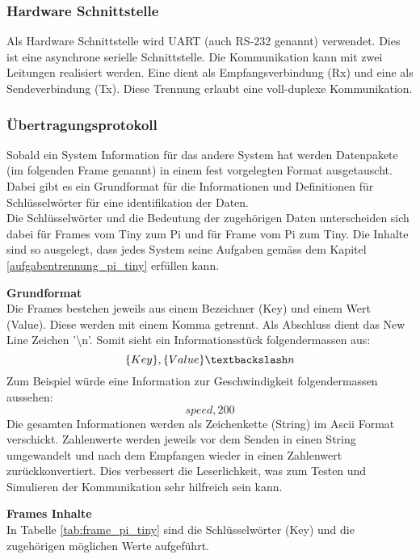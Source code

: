 \documentclass[../../main.tex]{subfiles}
\begin{document}
    \subsubsection{Hardware Schnittstelle}
    Als Hardware Schnittstelle wird UART (auch RS-232 genannt) verwendet. Dies ist eine asynchrone serielle Schnittstelle. Die Kommunikation kann mit zwei Leitungen realisiert werden. Eine dient als Empfangsverbindung (Rx) und eine als Sendeverbindung (Tx). Diese Trennung erlaubt eine voll-duplexe Kommunikation.

    \subsubsection{Übertragungsprotokoll}
    Sobald ein System Information für das andere System hat werden Datenpakete (im folgenden Frame genannt) in einem fest vorgelegten Format ausgetauscht. Dabei gibt es ein Grundformat für die Informationen und Definitionen für Schlüsselwörter für eine identifikation der Daten.\\
    Die Schlüsselwörter und die Bedeutung der zugehörigen Daten unterscheiden sich dabei für Frames vom Tiny zum Pi und für Frame vom Pi zum Tiny. Die Inhalte sind so ausgelegt, dass jedes System seine Aufgaben gemäss dem Kapitel \ref{aufgabentrennung_pi_tiny} erfüllen kann.

    \textbf{Grundformat}\\
    Die Frames bestehen jeweils aus einem Bezeichner (Key) und einem Wert (Value). Diese werden mit einem Komma getrennt. Als Abschluss dient das New Line Zeichen '\textbackslash n'. Somit sieht ein Informationsstück folgendermassen aus: $$\{Key\},\{Value\}\textbackslash n$$
    Zum Beispiel würde eine Information zur Geschwindigkeit folgendermassen aussehen: $$speed,200$$
    Die gesamten Informationen werden als Zeichenkette (String) im Ascii Format verschickt. Zahlenwerte werden jeweils vor dem Senden in einen String umgewandelt und nach dem Empfangen wieder in einen Zahlenwert zurückkonvertiert. Dies verbessert die Leserlichkeit, was zum Testen und Simulieren der Kommunikation sehr hilfreich sein kann.

    \textbf{Frames Inhalte}\\
    In Tabelle \ref{tab:frame_pi_tiny} sind die Schlüsselwörter (Key) und die zugehörigen möglichen Werte aufgeführt.\\
\end{document}
